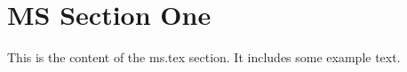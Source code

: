 \section{MS Section One}
This is the content of the ms.tex section. It includes some example text.

\lipsum[1] %
